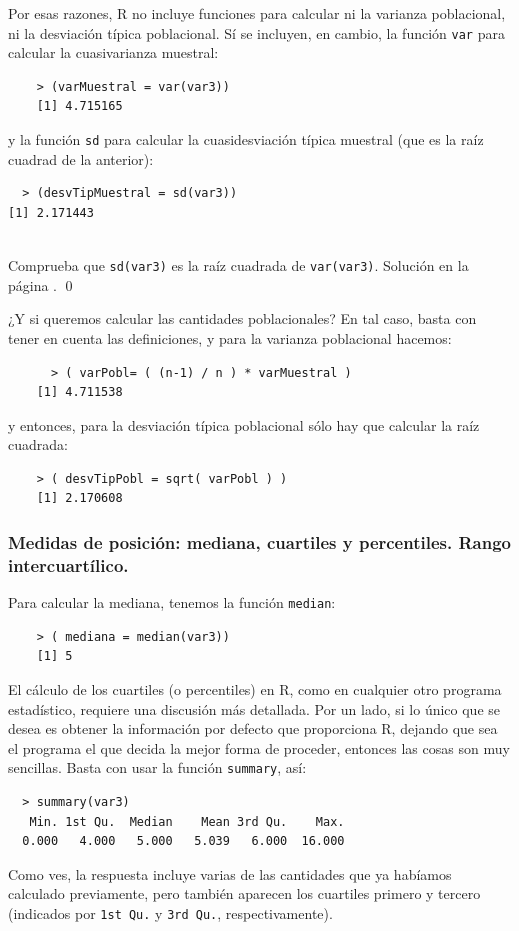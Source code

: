 \documentclass[10pt,a4paper]{article}\usepackage[]{graphicx}\usepackage[]{color}
\begin{document}
Por esas razones, R no incluye funciones para calcular ni la varianza poblacional, ni la desviación típica poblacional. Sí se  incluyen, en cambio, la función {\tt var} para calcular la cuasivarianza muestral:
\begin{verbatim}
    > (varMuestral = var(var3))
    [1] 4.715165
\end{verbatim}
y la función {\tt sd} para calcular la cuasidesviación típica muestral (que es la raíz cuadrad de la anterior):
\begin{verbatim}
  > (desvTipMuestral = sd(var3))
[1] 2.171443
\end{verbatim}

\begin{ejercicio}
\label{tut02:ejercicio17}
\quad\\
Comprueba que {\tt sd(var3)} es la raíz cuadrada de {\tt var(var3)}. Solución en la página \pageref{tut02:ejercicio17:sol}.
\qed
\end{ejercicio}

¿Y si queremos calcular las cantidades poblacionales? En tal caso, basta con tener en cuenta las definiciones, y para la varianza poblacional hacemos:
\begin{verbatim}
      > ( varPobl= ( (n-1) / n ) * varMuestral )
    [1] 4.711538
\end{verbatim}
y entonces, para la desviación típica poblacional sólo hay que calcular la raíz cuadrada:
\begin{verbatim}
    > ( desvTipPobl = sqrt( varPobl ) )
    [1] 2.170608
\end{verbatim}


\subsubsection*{Medidas de posición: mediana, cuartiles y percentiles. Rango intercuartílico.}

Para calcular la mediana, tenemos la función {\tt median}:
\begin{verbatim}
    > ( mediana = median(var3))
    [1] 5
\end{verbatim}

El cálculo de los cuartiles (o percentiles) en R, como en cualquier otro programa estadístico, requiere una discusión más detallada. Por un lado, si lo único que se desea es obtener la información por defecto que proporciona R, dejando que sea el programa el que decida la mejor forma de proceder, entonces las cosas son muy sencillas. Basta con usar la función {\tt summary}, así:
\begin{verbatim}
  > summary(var3)
   Min. 1st Qu.  Median    Mean 3rd Qu.    Max.
  0.000   4.000   5.000   5.039   6.000  16.000
\end{verbatim}
Como ves, la respuesta incluye varias de las cantidades que ya habíamos calculado previamente, pero también aparecen los cuartiles primero y tercero (indicados por {\tt 1st Qu.} y {\tt 3rd Qu.}, respectivamente).
\end{document}
